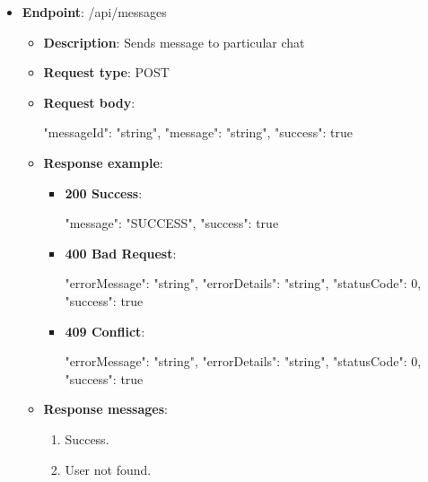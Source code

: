 \begin{itemize}
    \item \textbf{Endpoint}: /api/messages
    \begin{itemize}
        \item \textbf{Description}: Sends message to particular chat
        \item \textbf{Request type}: POST
        \item \textbf{Request body}:
        \begin{spverbatim}
        {
            "messageId": "string",
            "message": "string",
            "success": true
        }
        \end{spverbatim}
        \item \textbf{Response example}:
        \begin{itemize}
            \item \textbf{200 Success}:
            \begin{spverbatim}
            {
                "message": "SUCCESS",
                "success": true
            }
            \end{spverbatim}
            \item \textbf{400 Bad Request}:
            \begin{spverbatim}
            {
                "errorMessage": "string",
                "errorDetails": "string",
                "statusCode": 0,
                "success": true
            }
            \end{spverbatim}
            \item \textbf{409 Conflict}:
            \begin{spverbatim}
            {
                "errorMessage": "string",
                "errorDetails": "string",
                "statusCode": 0,
                "success": true
            }
            \end{spverbatim}
        \end{itemize}
        \item \textbf{Response messages}:
        \begin{enumerate}
            \item Success.
            \item User not found.
        \end{enumerate}
    \end{itemize}


\end{itemize}
